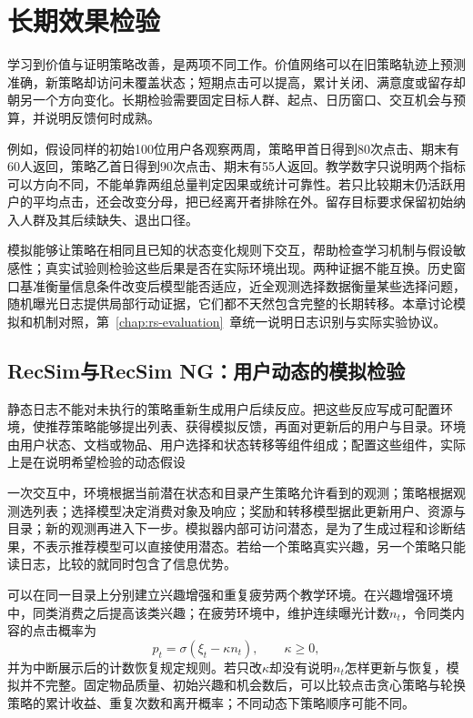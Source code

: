 \section{长期效果检验}
\label{sec:rs-long-term-evaluation}

学习到价值与证明策略改善，是两项不同工作。价值网络可以在旧策略轨迹上预测准确，新策略却访问未覆盖状态；短期点击可以提高，累计关闭、满意度或留存却朝另一个方向变化。长期检验需要固定目标人群、起点、日历窗口、交互机会与预算，并说明反馈何时成熟。

例如，假设同样的初始100位用户各观察两周，策略甲首日得到80次点击、期末有60人返回，策略乙首日得到90次点击、期末有55人返回。教学数字只说明两个指标可以方向不同，不能单靠两组总量判定因果或统计可靠性。若只比较期末仍活跃用户的平均点击，还会改变分母，把已经离开者排除在外。留存目标要求保留初始纳入人群及其后续缺失、退出口径。

模拟能够让策略在相同且已知的状态变化规则下交互，帮助检查学习机制与假设敏感性；真实试验则检验这些后果是否在实际环境出现。两种证据不能互换。历史窗口基准衡量信息条件改变后模型能否适应，近全观测选择数据衡量某些选择问题，随机曝光日志提供局部行动证据，它们都不天然包含完整的长期转移。本章讨论模拟和机制对照，第~\ref{chap:rs-evaluation}~章统一说明日志识别与实际实验协议。

\subsection{RecSim与RecSim NG：用户动态的模拟检验}
\label{sec:rs-recsim}

静态日志不能对未执行的策略重新生成用户后续反应。把这些反应写成可配置环境，使推荐策略能够提出列表、获得模拟反馈，再面对更新后的用户与目录。环境由用户状态、文档或物品、用户选择和状态转移等组件组成；配置这些组件，实际上是在说明希望检验的动态假设

一次交互中，环境根据当前潜在状态和目录产生策略允许看到的观测；策略根据观测选列表；选择模型决定消费对象及响应；奖励和转移模型据此更新用户、资源与目录；新的观测再进入下一步。模拟器内部可访问潜态，是为了生成过程和诊断结果，不表示推荐模型可以直接使用潜态。若给一个策略真实兴趣，另一个策略只能读日志，比较的就同时包含了信息优势。

可以在同一目录上分别建立兴趣增强和重复疲劳两个教学环境。在兴趣增强环境中，同类消费之后提高该类兴趣；在疲劳环境中，维护连续曝光计数$n_t$，令同类内容的点击概率为
\[
 p_t=\sigma(\xi_t-\kappa n_t),
 \qquad \kappa\geq0,
\]
并为中断展示后的计数恢复规定规则。若只改$\kappa$却没有说明$n_t$怎样更新与恢复，模拟并不完整。固定物品质量、初始兴趣和机会数后，可以比较点击贪心策略与轮换策略的累计收益、重复次数和离开概率；不同动态下策略顺序可能不同。

